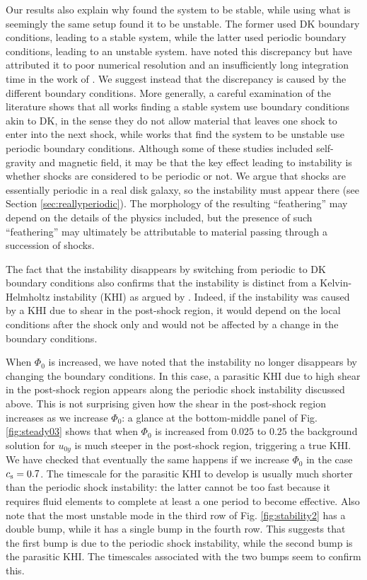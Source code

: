 \documentclass[useAMS,usenatbib]{mn2e}
\begin{document}
Our results also explain why \cite{DwarkadasBalbus1996} found the system to be stable, while \cite{KimKimKim2014} using what is seemingly the same setup found it to be unstable. The former used DK boundary conditions, leading to a stable system, while the latter used periodic boundary conditions, leading to an unstable system. \cite{KimKimKim2014} have noted this discrepancy but have attributed it to poor numerical resolution and an insufficiently long integration time in the work of \cite{DwarkadasBalbus1996}. We suggest instead that the discrepancy is caused by the different boundary conditions. More generally, a careful examination of the literature shows that all works finding a stable system \citep{BalbusCowie1985,Balbus1988} use boundary conditions akin to DK, in the sense they do not allow material that leaves one shock to enter into the next shock, while works that find the system to be unstable \citep{LeeShu2012,KimKimKim2014,KimKimElmegreen2015} use periodic boundary conditions. Although some of these studies included self-gravity and magnetic field, it may be that the key effect leading to instability is whether shocks are considered to be periodic or not. We argue that shocks are essentially periodic in a real disk galaxy, so the instability must appear there (see Section \ref{sec:reallyperiodic}). The morphology of the resulting ``feathering'' may depend on the details of the physics included, but the presence of such ``feathering'' may ultimately be attributable to material passing through a succession of shocks. 

The fact that the instability disappears by switching from periodic to DK boundary conditions also confirms that the instability is distinct from a Kelvin-Helmholtz instability (KHI) as argued by \cite{KimKimKim2014}. Indeed, if the instability was caused by a KHI due to shear in the post-shock region, it would depend on the local conditions after the shock only and would not be affected by a change in the boundary conditions. 

When $\Phi_0$ is increased, we have noted that the instability no longer disappears by changing the boundary conditions. In this case, a parasitic KHI due to high shear in the post-shock region appears along the periodic shock instability discussed above. This is not surprising given how the shear in the post-shock region increases as we increase $\Phi_0$: a glance at the bottom-middle panel of Fig. \ref{fig:steady03} shows that when $\Phi_0$ is increased from $0.025$ to $0.25$ the background solution for $u_{0y}$ is much steeper in the post-shock region, triggering a true KHI. We have checked that eventually the same happens if we increase $\Phi_0$ in the case $c_{\rm s}=0.7$. The timescale for the parasitic KHI to develop is usually much shorter than the periodic shock instability: the latter cannot be too fast because it requires fluid elements to complete at least a one period to become effective. Also note that the most unstable mode in the third row of Fig. \ref{fig:stability2} has a double bump, while it has a single bump in the fourth row. This suggests that the first bump is due to the periodic shock instability, while the second bump is the parasitic KHI. The timescales associated with the two bumps seem to confirm this.
\end{document}
